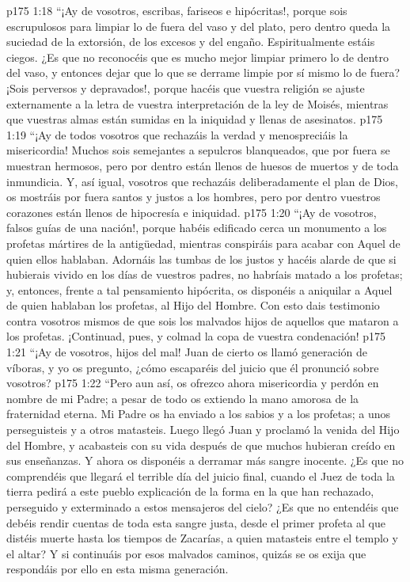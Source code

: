 \vs p175 1:18 “¡Ay de vosotros, escribas, fariseos e hipócritas!, porque sois escrupulosos para limpiar lo de fuera del vaso y del plato, pero dentro queda la suciedad de la extorsión, de los excesos y del engaño. Espiritualmente estáis ciegos. ¿Es que no reconocéis que es mucho mejor limpiar primero lo de dentro del vaso, y entonces dejar que lo que se derrame limpie por sí mismo lo de fuera? ¡Sois perversos y depravados!, porque hacéis que vuestra religión se ajuste externamente a la letra de vuestra interpretación de la ley de Moisés, mientras que vuestras almas están sumidas en la iniquidad y llenas de asesinatos.
\vs p175 1:19 “¡Ay de todos vosotros que rechazáis la verdad y menospreciáis la misericordia! Muchos sois semejantes a sepulcros blanqueados, que por fuera se muestran hermosos, pero por dentro están llenos de huesos de muertos y de toda inmundicia. Y, así igual, vosotros que rechazáis deliberadamente el plan de Dios, os mostráis por fuera santos y justos a los hombres, pero por dentro vuestros corazones están llenos de hipocresía e iniquidad.
\vs p175 1:20 “¡Ay de vosotros, falsos guías de una nación!, porque habéis edificado cerca un monumento a los profetas mártires de la antigüedad, mientras conspiráis para acabar con Aquel de quien ellos hablaban. Adornáis las tumbas de los justos y hacéis alarde de que si hubierais vivido en los días de vuestros padres, no habríais matado a los profetas; y, entonces, frente a tal pensamiento hipócrita, os disponéis a aniquilar a Aquel de quien hablaban los profetas, al Hijo del Hombre. Con esto dais testimonio contra vosotros mismos de que sois los malvados hijos de aquellos que mataron a los profetas. ¡Continuad, pues, y colmad la copa de vuestra condenación!
\vs p175 1:21 “¡Ay de vosotros, hijos del mal! Juan de cierto os llamó generación de víboras, y yo os pregunto, ¿cómo escaparéis del juicio que él pronunció sobre vosotros?
\vs p175 1:22 “Pero aun así, os ofrezco ahora misericordia y perdón en nombre de mi Padre; a pesar de todo os extiendo la mano amorosa de la fraternidad eterna. Mi Padre os ha enviado a los sabios y a los profetas; a unos perseguisteis y a otros matasteis. Luego llegó Juan y proclamó la venida del Hijo del Hombre, y acabasteis con su vida después de que muchos hubieran creído en sus enseñanzas. Y ahora os disponéis a derramar más sangre inocente. ¿Es que no comprendéis que llegará el terrible día del juicio final, cuando el Juez de toda la tierra pedirá a este pueblo explicación de la forma en la que han rechazado, perseguido y exterminado a estos mensajeros del cielo? ¿Es que no entendéis que debéis rendir cuentas de toda esta sangre justa, desde el primer profeta al que distéis muerte hasta los tiempos de Zacarías, a quien matasteis entre el templo y el altar? Y si continuáis por esos malvados caminos, quizás se os exija que respondáis por ello en esta misma generación.
